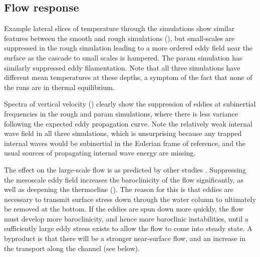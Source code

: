 \documentclass[twocol]{ametsocV5}
\newcommand{\tempS}[1]{}
\newcommand{\twowidth}[0]{4in}
\begin{document}
\subsection{Flow response}

Example lateral slices of temperature through the simulations show similar features between the {\sc smooth} and {\sc rough} simulations (), but small-scales are suppressed in the {\sc rough} simulation leading to a more ordered eddy field near the surface as the cascade to small scales is hampered. The {\sc param} simulation has similarly suppressed eddy filamentation.  Note that all three simulations have different mean temperatures at these depths, a symptom of the fact that none of the runs are in thermal equilibrium.

Spectra of vertical velocity () clearly show the suppression of eddies at subinertial frequencies in the {\sc rough} and {\sc param} simulations, where there is less variance following the expected eddy propagation curve.  Note the relatively weak internal wave field in all three simulations, which is unsurprising because any trapped internal waves would be subinertial in the Eulerian frame of reference, and the usual sources of propagating internal wave energy are missing.


The effect on the large-scale flow is as predicted by other studies  \citep[i.e.][]{Marshall_2017}.  Suppressing the mesoscale eddy field increases the baroclinicity of the flow significantly, as well as deepening the thermocline ().  The reason for this is that eddies are necessary to transmit surface stress down through the water column to ultimately be removed at the bottom.  If the eddies are spun down more quickly, the flow must develop more baroclinicity, and hence more baroclinic instabilities,  until a sufficiently large eddy stress exists to allow the flow to come into steady state.  A byproduct is that there will be a stronger near-surface flow, and an increase in the transport along the channel (see below).
\end{document}
